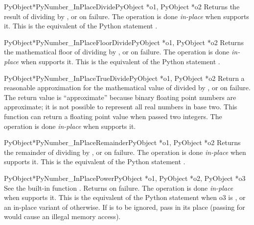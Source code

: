 \begin{cfuncdesc}{PyObject*}{PyNumber_InPlaceDivide}{PyObject *o1,
                                                     PyObject *o2}
  Returns the result of dividing  by , or \NULL{} on
  failure.  The operation is done \emph{in-place} when 
  supports it. This is the equivalent of the Python statement
  .
\end{cfuncdesc}


\begin{cfuncdesc}{PyObject*}{PyNumber_InPlaceFloorDivide}{PyObject *o1,
                                                          PyObject *o2}
  Returns the mathematical floor of dividing  by , or
  \NULL{} on failure.  The operation is done \emph{in-place} when
   supports it.  This is the equivalent of the Python
  statement .
\end{cfuncdesc}


\begin{cfuncdesc}{PyObject*}{PyNumber_InPlaceTrueDivide}{PyObject *o1,
                                                         PyObject *o2}
  Return a reasonable approximation for the mathematical value of
   divided by , or \NULL{} on failure.  The return
  value is ``approximate'' because binary floating point numbers are
  approximate; it is not possible to represent all real numbers in
  base two.  This function can return a floating point value when
  passed two integers.  The operation is done \emph{in-place} when
   supports it.
\end{cfuncdesc}


\begin{cfuncdesc}{PyObject*}{PyNumber_InPlaceRemainder}{PyObject *o1,
                                                        PyObject *o2}
  Returns the remainder of dividing  by , or \NULL{}
  on failure.  The operation is done \emph{in-place} when 
  supports it.  This is the equivalent of the Python statement
  .
\end{cfuncdesc}


\begin{cfuncdesc}{PyObject*}{PyNumber_InPlacePower}{PyObject *o1,
                                                    PyObject *o2, PyObject *o3}
  See the built-in function .
  Returns \NULL{} on failure.  The operation is done \emph{in-place}
  when  supports it.  This is the equivalent of the Python
  statement  when o3 is ,
  or an in-place variant of 
  otherwise. If  is to be ignored, pass  in its
  place (passing \NULL{} for  would cause an illegal memory
  access).
\end{cfuncdesc}

